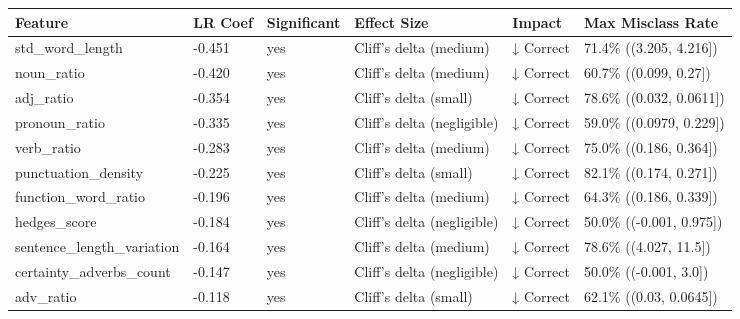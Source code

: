\begin{tabular}{llllll}
\toprule
Feature & LR Coef & Significant & Effect Size & Impact & Max Misclass Rate \\
\midrule
std\_word\_length & -0.451 & yes & Cliff's delta (medium) & ↓ Correct & 71.4\% ((3.205, 4.216]) \\
noun\_ratio & -0.420 & yes & Cliff's delta (medium) & ↓ Correct & 60.7\% ((0.099, 0.27]) \\
adj\_ratio & -0.354 & yes & Cliff's delta (small) & ↓ Correct & 78.6\% ((0.032, 0.0611]) \\
pronoun\_ratio & -0.335 & yes & Cliff's delta (negligible) & ↓ Correct & 59.0\% ((0.0979, 0.229]) \\
verb\_ratio & -0.283 & yes & Cliff's delta (medium) & ↓ Correct & 75.0\% ((0.186, 0.364]) \\
punctuation\_density & -0.225 & yes & Cliff's delta (small) & ↓ Correct & 82.1\% ((0.174, 0.271]) \\
function\_word\_ratio & -0.196 & yes & Cliff's delta (medium) & ↓ Correct & 64.3\% ((0.186, 0.339]) \\
hedges\_score & -0.184 & yes & Cliff's delta (negligible) & ↓ Correct & 50.0\% ((-0.001, 0.975]) \\
sentence\_length\_variation & -0.164 & yes & Cliff's delta (medium) & ↓ Correct & 78.6\% ((4.027, 11.5]) \\
certainty\_adverbs\_count & -0.147 & yes & Cliff's delta (negligible) & ↓ Correct & 50.0\% ((-0.001, 3.0]) \\
adv\_ratio & -0.118 & yes & Cliff's delta (small) & ↓ Correct & 62.1\% ((0.03, 0.0645]) \\
\bottomrule
\end{tabular}
